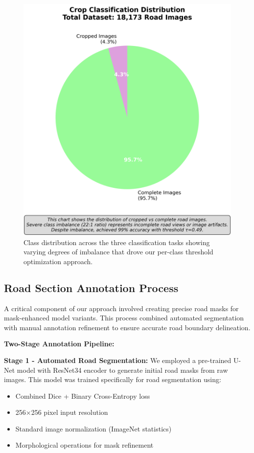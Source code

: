 \documentclass[12pt]{article}
\begin{document}
\begin{figure}[!htb]
\begin{minipage}{0.32\textwidth}
\end{minipage}
\hfill
\begin{minipage}{0.32\textwidth}
\centering
\includegraphics[width=\textwidth]{images/crop_classification_distribution.png}
\end{minipage}
\caption{Class distribution across the three classification tasks showing varying degrees of imbalance that drove our per-class threshold optimization approach.}
\end{figure}

\subsection{Road Section Annotation Process}

A critical component of our approach involved creating precise road masks for mask-enhanced model variants. This process combined automated segmentation with manual annotation refinement to ensure accurate road boundary delineation.

\textbf{Two-Stage Annotation Pipeline:}

\textbf{Stage 1 - Automated Road Segmentation:} We employed a pre-trained U-Net model with ResNet34 encoder to generate initial road masks from raw images. This model was trained specifically for road segmentation using:
\begin{itemize}[itemsep=1pt,parsep=0pt,topsep=2pt]
\item Combined Dice + Binary Cross-Entropy loss
\item 256×256 pixel input resolution
\item Standard image normalization (ImageNet statistics)
\item Morphological operations for mask refinement
\end{itemize}
\end{document}
